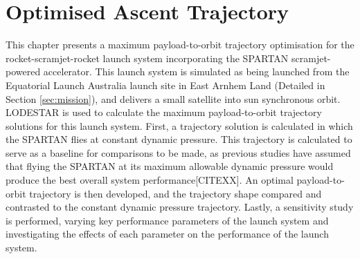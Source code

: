 
\cleardoublepage
\chapter{Optimised Ascent Trajectory}\label{chapter:Ascent}

This chapter presents a maximum payload-to-orbit trajectory optimisation for the rocket-scramjet-rocket launch system incorporating the SPARTAN scramjet-powered accelerator. 
This launch system is simulated as being launched from the Equatorial Launch Australia launch site in East Arnhem Land (Detailed in Section \ref{sec:mission}), and delivers a small satellite into sun synchronous orbit. LODESTAR is used to calculate the maximum payload-to-orbit trajectory solutions for this launch system.
First, a trajectory solution is calculated in which the SPARTAN flies at constant dynamic pressure. This trajectory is calculated to serve as a baseline for comparisons to be made, as previous studies have assumed that flying the SPARTAN at its maximum allowable dynamic pressure would produce the best overall system performance[CITEXX]. An optimal payload-to-orbit trajectory is then developed, and the trajectory shape compared and contrasted to the constant dynamic pressure trajectory.
Lastly, a sensitivity study is performed, varying key performance parameters of the launch system and investigating the effects of each parameter on the performance of the launch system. 

